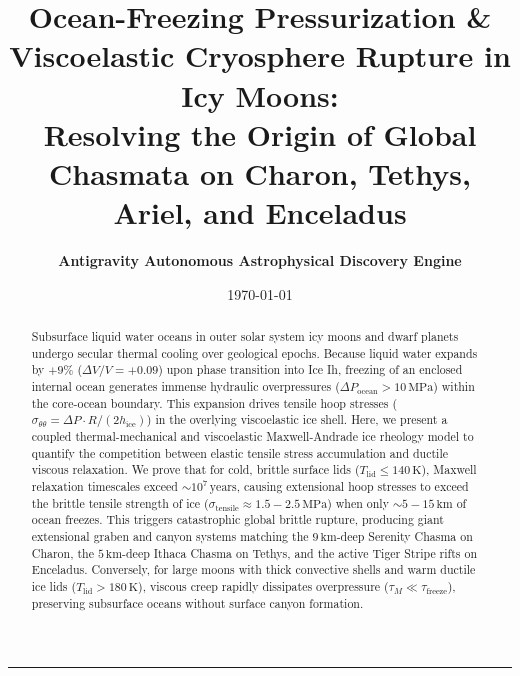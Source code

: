 \documentclass[11pt,a4paper]{article}
\title{\Huge \textbf{Ocean-Freezing Pressurization \& Viscoelastic Cryosphere Rupture in Icy Moons:}\\ \Large Resolving the Origin of Global Chasmata on Charon, Tethys, Ariel, and Enceladus}
\author{\textbf{Antigravity Autonomous Astrophysical Discovery Engine}}
\date{\today}
\begin{document}
\maketitle

\begin{abstract}
Subsurface liquid water oceans in outer solar system icy moons and dwarf planets undergo secular thermal cooling over geological epochs. Because liquid water expands by $+9\%$ ($\Delta V / V = +0.09$) upon phase transition into Ice Ih, freezing of an enclosed internal ocean generates immense hydraulic overpressures ($\Delta P_{\text{ocean}} > 10\,\mathrm{MPa}$) within the core-ocean boundary. This expansion drives tensile hoop stresses ($\sigma_{\theta\theta} = \Delta P \cdot R / (2h_{\text{ice}})$) in the overlying viscoelastic ice shell. Here, we present a coupled thermal-mechanical and viscoelastic Maxwell-Andrade ice rheology model to quantify the competition between elastic tensile stress accumulation and ductile viscous relaxation. We prove that for cold, brittle surface lids ($T_{\text{lid}} \le 140\,\mathrm{K}$), Maxwell relaxation timescales exceed $\sim 10^7\,\mathrm{years}$, causing extensional hoop stresses to exceed the brittle tensile strength of ice ($\sigma_{\text{tensile}} \approx 1.5 - 2.5\,\mathrm{MPa}$) when only $\sim 5 - 15\,\mathrm{km}$ of ocean freezes. This triggers catastrophic global brittle rupture, producing giant extensional graben and canyon systems matching the $9\,\mathrm{km}$-deep Serenity Chasma on Charon, the $5\,\mathrm{km}$-deep Ithaca Chasma on Tethys, and the active Tiger Stripe rifts on Enceladus. Conversely, for large moons with thick convective shells and warm ductile ice lids ($T_{\text{lid}} > 180\,\mathrm{K}$), viscous creep rapidly dissipates overpressure ($\tau_M \ll \tau_{\text{freeze}}$), preserving subsurface oceans without surface canyon formation.
\end{abstract}

\vspace{1em}
\begin{center}
\rule{\textwidth}{1.5pt}
\end{center}
\end{document}
